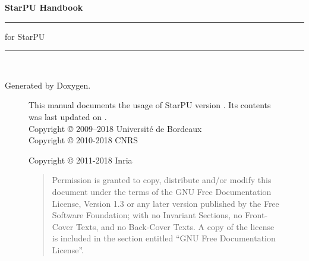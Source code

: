 %
%
%
%
%

\setlength{\parskip}{0pt}
\begin{titlepage}
\vspace*{4cm}
{\Huge \textbf{StarPU Handbook}}\\
\rule{\textwidth}{1.5mm}
\begin{flushright}
{\Large for StarPU \STARPUVERSION}
\end{flushright}
\rule{\textwidth}{1mm}
~\\
\vspace*{15cm}
\begin{flushright}
Generated by Doxygen.
\end{flushright}
\end{titlepage}

\begin{figure}[p]
This manual documents the usage of StarPU version \STARPUVERSION. Its contents
was last updated on \STARPUUPDATED.\\

Copyright © 2009–2018 Université de Bordeaux\\

Copyright © 2010-2018 CNRS

Copyright © 2011-2018 Inria

\medskip

\begin{quote}
Permission is granted to copy, distribute and/or modify this document
under the terms of the GNU Free Documentation License, Version 1.3 or
any later version published by the Free Software Foundation; with no
Invariant Sections, no Front-Cover Texts, and no Back-Cover Texts. A
copy of the license is included in the section entitled “GNU Free
Documentation License”.
\end{quote}
\end{figure}

